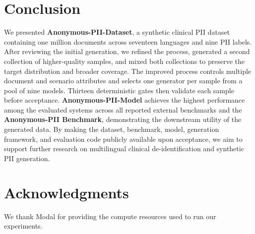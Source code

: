\documentclass[11pt]{article}
\begin{document}
\section{Conclusion}

We presented \textbf{Anonymous-PII-Dataset}, a synthetic clinical PII dataset containing one million documents across seventeen languages and nine PII labels. After reviewing the initial generation, we refined the process, generated a second collection of higher-quality samples, and mixed both collections to preserve the target distribution and broader coverage. The improved process controls multiple document and scenario attributes and selects one generator per sample from a pool of nine models. Thirteen deterministic gates then validate each sample before acceptance. \textbf{Anonymous-PII-Model} achieves the highest performance among the evaluated systems across all reported external benchmarks and the \textbf{Anonymous-PII Benchmark}, demonstrating the downstream utility of the generated data. By making the dataset, benchmark, model, generation framework, and evaluation code publicly available upon acceptance, we aim to support further research on multilingual clinical de-identification and synthetic PII generation.

\section*{Acknowledgments}

We thank Modal for providing the compute resources used to run our experiments.


\end{document}
